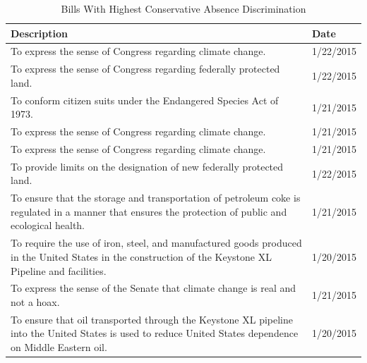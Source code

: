 	\begin{table}[!h]
		\centering
		\caption{Bills With Highest Conservative Absence Discrimination}
		\label{con_bills}
		\begin{tabular}{p{6in}l}
			Description                                                                                                                                              & Date      \\
			\midrule
			To express the sense of Congress regarding climate change.                                                                                               & 1/22/2015 \\
			To express the sense of Congress regarding federally protected land.                                                                                     & 1/22/2015 \\
			To conform citizen suits under the Endangered Species Act of 1973.                                                                                       & 1/21/2015 \\
			To express the sense of Congress regarding climate change.                                                                                               & 1/21/2015 \\
			To express the sense of Congress regarding climate change.                                                                                               & 1/21/2015 \\
			To provide limits on the designation of new federally protected land.                                                                                    & 1/22/2015 \\
			To ensure that the storage and transportation of petroleum coke is regulated in a manner that ensures the protection of public and ecological health.    & 1/21/2015 \\
			To require the use of iron, steel, and manufactured goods produced in the United States in the construction of the Keystone XL Pipeline and facilities.  & 1/20/2015 \\
			To express the sense of the Senate that climate change is real and not a hoax.                                                                           & 1/21/2015 \\
			To ensure that oil transported through the Keystone XL pipeline into the United States is used to reduce United States dependence on Middle Eastern oil. & 1/20/2015
		\end{tabular}
	\end{table}

